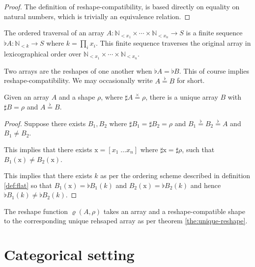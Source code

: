 \documentclass{DIKU-report-variant}
\newcommand\brm[1]{\bm{\mathrm{#1}}}
\newcommand\Nat{\mathbb{N}}
\newcommand\prodeq{\stackrel{\times}{=}}
\newcommand\flateq{\stackrel{\flat}{=}}
\newcommand\contradict{\def\qed{\hspace*{\fill}\raisebox{-.2ex}{\lightning}}}
\begin{document}
\begin{proof}
  The definition of reshape-compatibility, is based directly on equality
  on natural numbers, which is trivially an equivalence relation.
\end{proof}

\begin{definition}
  \label{def:flat}
  The ordered traversal of an array \(A : \Nat_{<x_1} \times \cdots \times \Nat_{<x_n} \to S\) is
  a finite sequence \(\flat A : \Nat_{<k} \to S\) where \(k = \prod_i x_i\). This finite sequence
  traverses the original array in lexicographical order over \(\Nat_{<x_1} \times \cdots \times \Nat_{<x_n}\).
\end{definition}

\begin{definition}
  \label{def:reshape-equiv}
  Two arrays are the reshapes of one another when \(\flat A = \flat B\). This of course
  implies reshape-compatibility. We may occasionally write \(A \flateq B\) for short.
\end{definition}

\begin{theorem}
  \label{the:unique-reshape}
  Given an array \(A\) and a shape \(\rho\), where \(\sharp A \prodeq \rho\), there is a unique
  array \(B\) with \(\sharp B = \rho\) and \(A \flateq B\).
\end{theorem}
\begin{proof}
  Suppose there exists \(B_1, B_2\) where \(\sharp B_1 = \sharp B_2 = \rho\)
  and \(B_1 \flateq B_2 \flateq A\) and \(B_1 \neq B_2\).
  
  This implies that there exists \(\brm x = [x_1\; \dots x_n]\) where \(\sharp \brm x = \sharp \rho\),
  such that \(B_1(\brm x) \neq B_2(\brm x)\).

  This implies that there exists \(k\) as per the ordering scheme
  described in definition \ref{def:flat} so that \(B_1(\brm x) = \flat B_1 (k)\) and
  \(B_2(\brm x) = \flat B_2 (k)\) and hence \(\flat B_1(k) \neq \flat B_2(k)\). \contradict
\end{proof}

\begin{definition}
  The reshape function \(\varrho(A, \rho)\) takes an array and a reshape-compatible shape
  to the corresponding unique rehsaped array as per theorem \ref{the:unique-reshape}.
\end{definition}

\section{Categorical setting}
\end{document}
